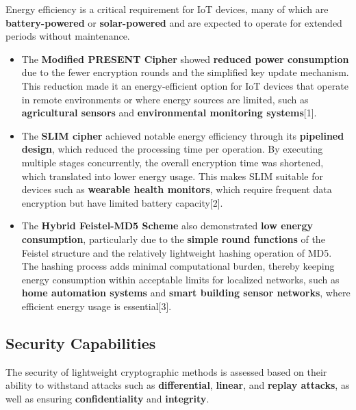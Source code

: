 \documentclass{article}
\begin{document}
Energy efficiency is a critical requirement for IoT devices, many of which are \textbf{battery-powered} or \textbf{solar-powered} and are expected to operate for extended periods without maintenance.

\begin{itemize}
    \item The \textbf{Modified PRESENT Cipher} showed \textbf{reduced power consumption} due to the fewer encryption rounds and the simplified key update mechanism. This reduction made it an energy-efficient option for IoT devices that operate in remote environments or where energy sources are limited, such as \textbf{agricultural sensors} and \textbf{environmental monitoring systems}[1].
    \item The \textbf{SLIM cipher} achieved notable energy efficiency through its \textbf{pipelined design}, which reduced the processing time per operation. By executing multiple stages concurrently, the overall encryption time was shortened, which translated into lower energy usage. This makes SLIM suitable for devices such as \textbf{wearable health monitors}, which require frequent data encryption but have limited battery capacity[2].
    \item The \textbf{Hybrid Feistel-MD5 Scheme} also demonstrated \textbf{low energy consumption}, particularly due to the \textbf{simple round functions} of the Feistel structure and the relatively lightweight hashing operation of MD5. The hashing process adds minimal computational burden, thereby keeping energy consumption within acceptable limits for localized networks, such as \textbf{home automation systems} and \textbf{smart building sensor networks}, where efficient energy usage is essential[3].
\end{itemize}

\subsection{Security Capabilities}

The security of lightweight cryptographic methods is assessed based on their ability to withstand attacks such as \textbf{differential}, \textbf{linear}, and \textbf{replay attacks}, as well as ensuring \textbf{confidentiality} and \textbf{integrity}.
\end{document}

